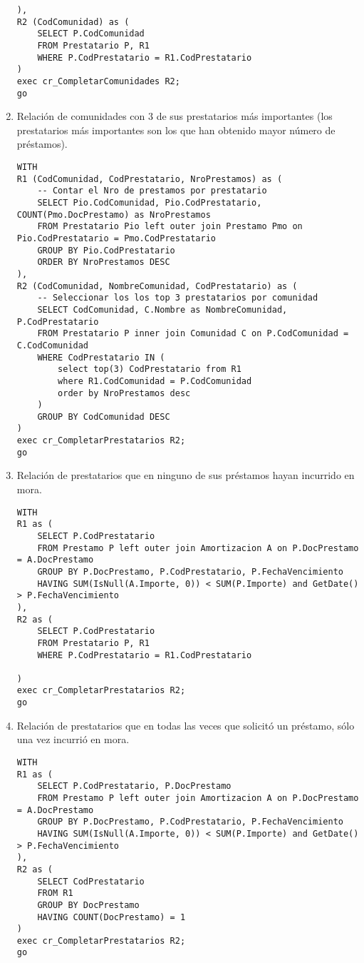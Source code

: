 \begin{enumerate}
\begin{verbatim}
),
R2 (CodComunidad) as (
    SELECT P.CodComunidad
    FROM Prestatario P, R1
    WHERE P.CodPrestatario = R1.CodPrestatario
)
exec cr_CompletarComunidades R2;
go
\end{verbatim}

\item Relación de comunidades con 3 de sus prestatarios más importantes (los
prestatarios más importantes son los que han obtenido mayor número de
préstamos).

\begin{verbatim}
WITH
R1 (CodComunidad, CodPrestatario, NroPrestamos) as (
    -- Contar el Nro de prestamos por prestatario
    SELECT Pio.CodComunidad, Pio.CodPrestatario, COUNT(Pmo.DocPrestamo) as NroPrestamos
    FROM Prestatario Pio left outer join Prestamo Pmo on Pio.CodPrestatario = Pmo.CodPrestatario
    GROUP BY Pio.CodPrestatario
    ORDER BY NroPrestamos DESC
),
R2 (CodComunidad, NombreComunidad, CodPrestatario) as (
    -- Seleccionar los los top 3 prestatarios por comunidad
    SELECT CodComunidad, C.Nombre as NombreComunidad, P.CodPrestatario
    FROM Prestatario P inner join Comunidad C on P.CodComunidad = C.CodComunidad
    WHERE CodPrestatario IN (
        select top(3) CodPrestatario from R1
        where R1.CodComunidad = P.CodComunidad
        order by NroPrestamos desc
    )
    GROUP BY CodComunidad DESC
)
exec cr_CompletarPrestatarios R2;
go
\end{verbatim}

\item Relación de prestatarios que en ninguno de sus préstamos hayan incurrido en mora.

\begin{verbatim}
WITH
R1 as (
    SELECT P.CodPrestatario
    FROM Prestamo P left outer join Amortizacion A on P.DocPrestamo = A.DocPrestamo
    GROUP BY P.DocPrestamo, P.CodPrestatario, P.FechaVencimiento
    HAVING SUM(IsNull(A.Importe, 0)) < SUM(P.Importe) and GetDate() > P.FechaVencimiento
),
R2 as (
    SELECT P.CodPrestatario
    FROM Prestatario P, R1
    WHERE P.CodPrestatario = R1.CodPrestatario

)
exec cr_CompletarPrestatarios R2;
go
\end{verbatim}

\item Relación de prestatarios que en todas las veces que solicitó un préstamo,
sólo una vez incurrió en mora.

\begin{verbatim}
WITH
R1 as (
    SELECT P.CodPrestatario, P.DocPrestamo
    FROM Prestamo P left outer join Amortizacion A on P.DocPrestamo = A.DocPrestamo
    GROUP BY P.DocPrestamo, P.CodPrestatario, P.FechaVencimiento
    HAVING SUM(IsNull(A.Importe, 0)) < SUM(P.Importe) and GetDate() > P.FechaVencimiento
),
R2 as (
    SELECT CodPrestatario
    FROM R1
    GROUP BY DocPrestamo
    HAVING COUNT(DocPrestamo) = 1
)
exec cr_CompletarPrestatarios R2;
go
\end{verbatim}


\end{enumerate}
